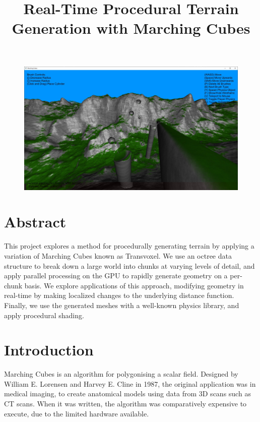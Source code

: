 \documentclass[11pt]{article}
\title{Real-Time Procedural Terrain Generation with Marching Cubes}
\author{}
\date{}
\begin{document}
% 


\maketitle
\begin{figure}[H]
  \includegraphics[width=\textwidth]{shaded_mountains.jpg}
\end{figure}
\newpage

\section*{Abstract} 
This project explores a method for procedurally generating terrain by applying a variation of Marching Cubes known as Transvoxel. We use an octree data structure to break down a large world into chunks at varying levels of detail, and apply parallel processing on the GPU to rapidly generate geometry on a per-chunk basis. We explore applications of this approach, modifying geometry in real-time by making localized changes to the underlying distance function. Finally, we use the generated meshes with a well-known physics library, and apply procedural shading.
\newpage

\tableofcontents

\newpage
\section{Introduction} 

Marching Cubes is an algorithm for polygonising a scalar field. Designed by William E. Lorensen and Harvey E. Cline in 1987\cite{10.1145/37402.37422}, the original application was in medical imaging, to create anatomical models using data from 3D scans such as CT scans. When it was written, the algorithm was comparatively expensive to execute, due to the limited hardware available. 
\end{document}
